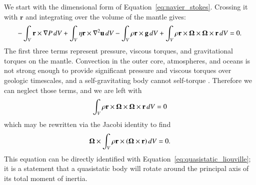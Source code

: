 \documentclass[preprint,12pt,authoryear]{elsarticle}
\newcommand{\mitbf}[1]{\hbox{\mathversion{bold}$#1$}}
\begin{document}
We start with the dimensional form of 
Equation~\eqref{eq:navier_stokes}.  Crossing it with $\mathbf{r}$ and integrating over the volume of the mantle gives:
\begin{equation}
\begin{aligned}
-\int_V \mathbf{r} \times \nabla P \,dV + \int_V \eta \mathbf{r} \times \nabla^2 \mathbf{u} \,dV - \int_V \rho \mathbf{r} \times \mathbf{g} \,dV 
   + \int_V \rho \mathbf{r} \times \mitbf{\Omega} \times \mitbf{\Omega} \times \mathbf{r}  \,dV &= 0. \\
\end{aligned}
\end{equation}
The first three terms represent pressure, viscous torques, and gravitational torques on the mantle.  
Convection in the outer core, atmospheres, and oceans is not strong enough to provide significant pressure and viscous torques over geologic timescales, and a self-gravitating body cannot self-torque \citep{braginsky1995equations}.
Therefore we can neglect those terms, and we are left with
\begin{equation}
\begin{aligned}
\int_V \rho \mathbf{r} \times \mitbf{\Omega} \times \mitbf{\Omega} \times \mathbf{r} \,dV &= 0 \\
\label{eq:quasistatic_angular_momentum}
\end{aligned}
\end{equation}
which may be rewritten via the Jacobi identity to find
\begin{equation}
\begin{aligned}
 \mitbf{\Omega} \times \int_V \rho \mathbf{r} \times (\mitbf{\Omega}\times \mathbf{r}) \,dV &= 0. \\
\end{aligned}
\end{equation}
This equation can be directly identified with Equation~\eqref{eq:quasistatic_liouville}; it 
 is a statement that a quasistatic body will rotate around the principal axis of its total moment of inertia.
\end{document}
